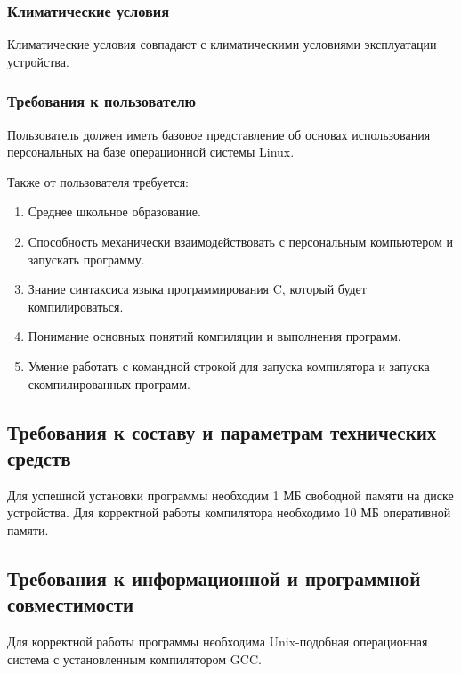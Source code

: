 \subsubsection{Климатические условия}
Климатические условия совпадают с климатическими условиями эксплуатации устройства.

\subsubsection{Требования к пользователю}
Пользователь должен иметь базовое представление об основах использования персональных на базе операционной системы Linux.

Также от пользователя требуется:
\begin{enumerate}
  \item Среднее школьное образование.
  \item Способность механически взаимодействовать с персональным компьютером и запускать программу.
  \item Знание синтаксиса языка программирования C, который будет компилироваться.
  \item Понимание основных понятий компиляции и выполнения программ.
  \item Умение работать с командной строкой для запуска компилятора и запуска скомпилированных программ.
\end{enumerate}

\subsection{Требования к составу и параметрам технических средств}
Для успешной установки программы необходим 1 МБ свободной памяти на диске устройства.
Для корректной работы компилятора необходимо 10 МБ оперативной памяти.

\subsection{Требования к информационной и программной совместимости}
Для корректной работы программы необходима Unix-подобная операционная система с установленным компилятором GCC.
